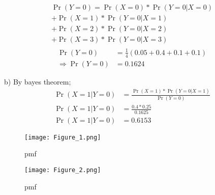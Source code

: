 \documentclass[journal,12pt,twocolumn]{IEEEtran}
\providecommand{\pr}[1]{\ensuremath{\Pr\left(#1\right)}}
\begin{document}
    \begin{multline}
    \begin{split}
    \pr{Y=0}=\pr{X=0}*\pr{Y=0|X=0}\\+\pr{X=1}*\pr{Y=0|X=1}\\+
        \pr{X=2}*\pr{Y=0|X=2}\\+\pr{X=3}*\pr{Y=0|X=3}
\end{split}
\end{multline}
\begin{align}
    \pr{Y=0} &=\frac{1}{4}(0.05+0.4+0.1+0.1)\\
    \Rightarrow\pr{Y=0} &=0.1624
\end{align}    
  
    b) By bayes theorem;
    \begin{align}
           \pr{X=1|Y=0}&=\frac{\pr{X=1}*\pr{Y=0|X=1}}{\pr{Y=0}}\\
           \pr{X=1|Y=0}&=\frac{0.4*0.25}{0.1625}\\
           \pr{X=1|Y=0}&=0.6153
    \end{align}
    \newpage
      \begin{figure}[h!]
        \centering
        \texttt{[image: Figure\_1.png]}
        \caption{pmf}
        \label{fig:my_label}
    \end{figure}
      \begin{figure}[h]
          \centering
          \texttt{[image: Figure\_2.png]}
          \caption{pmf}
          \label{fig:my_label}
      \end{figure}
    
    
   
\end{document}
